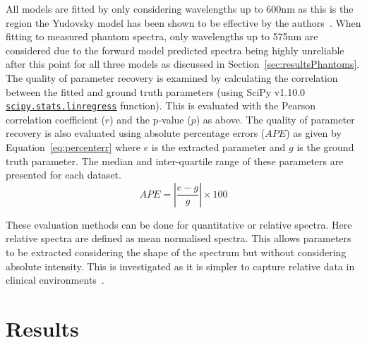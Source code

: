 All models are fitted by only considering wavelengths up to 600nm as this is the region the Yudovsky model has been shown to be effective by the authors~\citep{Yudovsky2011a}.
When fitting to measured phantom spectra, only wavelengths up to 575nm are considered due to the forward model predicted spectra being highly unreliable after this point for all three models as discussed in Section~\ref{sec:resultsPhantoms}. The quality of parameter recovery is examined by calculating the correlation between the fitted and ground truth parameters (using SciPy v1.10.0 \href{https://docs.scipy.org/doc/scipy/reference/generated/scipy.stats.linregress.html}{\texttt{scipy.stats.linregress}} function). This is evaluated with the Pearson correlation coefficient ($r$) and the p-value ($p$) as above. The quality of parameter recovery is also evaluated using absolute percentage errors ($APE$) as given by Equation~\eqref{eq:percenterr} where $e$ is the extracted parameter and $g$ is the ground truth parameter. The median and inter-quartile range of these parameters are presented for each dataset. 
\begin{equation}
    APE = |\frac{e - g}{g}| \times 100 
    \label{eq:percenterr}
\end{equation}

These evaluation methods can be done for quantitative or relative spectra. Here relative spectra are defined as mean normalised spectra. This allows parameters to be extracted considering the shape of the spectrum but without considering absolute intensity. This is investigated as it is simpler to capture relative data in clinical environments~\citep{Bahl2023}.

\section{Results}\label{sec:results}
